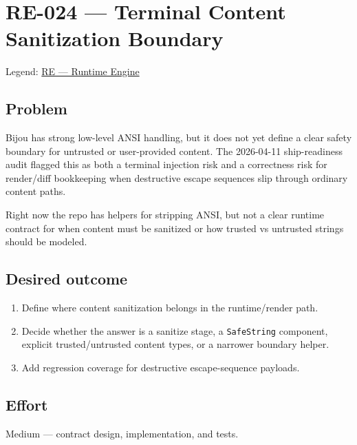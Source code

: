 \chapter{RE-024 --- Terminal Content Sanitization Boundary}\label{record-380}

\smallskip

Legend: \href{https://github.com/flyingrobots/bijou/blob/cbd70612140e7a450d764b3c7be1c6af878b99bc/docs/method/graveyard/legends/RE-runtime-engine.md}{RE --- Runtime Engine}

\section{Problem}\label{record-380-problem}

Bijou has strong low-level ANSI handling, but it does not yet define a clear safety boundary for untrusted or user-provided content. The 2026-04-11 ship-readiness audit flagged this as both a terminal injection risk and a correctness risk for render/diff bookkeeping when destructive escape sequences slip through ordinary content paths.

Right now the repo has helpers for stripping ANSI, but not a clear runtime contract for when content must be sanitized or how trusted vs untrusted strings should be modeled.

\section{Desired outcome}\label{record-380-desired-outcome}

\begin{enumerate}
\def\labelenumi{\arabic{enumi}.}
\tightlist
\item
  Define where content sanitization belongs in the runtime/render path.
\item
  Decide whether the answer is a sanitize stage, a \texttt{S\allowbreak{}a\allowbreak{}f\allowbreak{}e\allowbreak{}S\allowbreak{}t\allowbreak{}r\allowbreak{}i\allowbreak{}n\allowbreak{}g} component, explicit trusted/untrusted content types, or a narrower boundary helper.
\item
  Add regression coverage for destructive escape-sequence payloads.
\end{enumerate}

\section{Effort}\label{record-380-effort}

Medium --- contract design, implementation, and tests.


